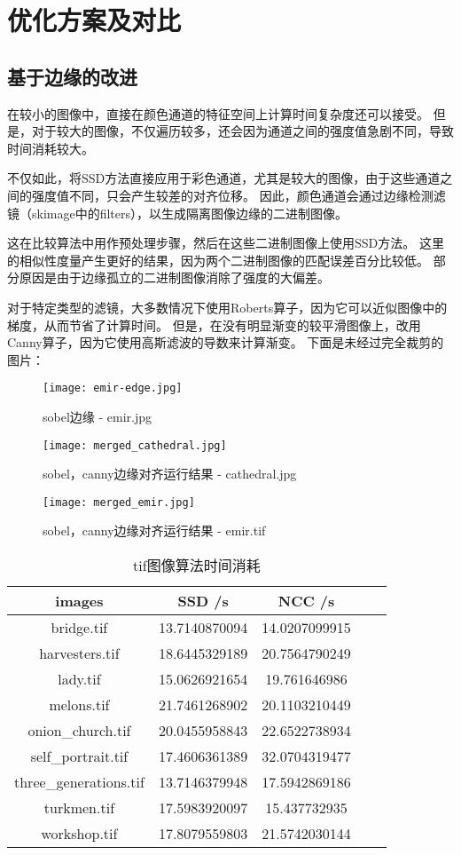 \documentclass[withoutpreface,bwprint]{cumcmthesis} %
\begin{document}
\section{优化方案及对比}

\subsection{基于边缘的改进}
在较小的图像中，直接在颜色通道的特征空间上计算时间复杂度还可以接受。 但是，对于较大的图像，不仅遍历较多，还会因为通道之间的强度值急剧不同，导致时间消耗较大。

不仅如此，将SSD方法直接应用于彩色通道，尤其是较大的图像，由于这些通道之间的强度值不同，只会产生较差的对齐位移。 因此，颜色通道会通过边缘检测滤镜（skimage中的filters），以生成隔离图像边缘的二进制图像。

这在比较算法中用作预处理步骤，然后在这些二进制图像上使用SSD方法。 这里的相似性度量产生更好的结果，因为两个二进制图像的匹配误差百分比较低。 部分原因是由于边缘孤立的二进制图像消除了强度的大偏差。

对于特定类型的滤镜，大多数情况下使用Roberts算子，因为它可以近似图像中的梯度，从而节省了计算时间。 但是，在没有明显渐变的较平滑图像上，改用Canny算子，因为它使用高斯滤波的导数来计算渐变。
下面是未经过完全裁剪的图片：
\begin{figure}[H]
	\centering
	\texttt{[image: emir-edge.jpg]}
    \caption{ sobel边缘 - emir.jpg \label{fig:1}}
\end{figure}

\begin{figure}[H]
	\centering
	\texttt{[image: merged\_cathedral.jpg]}
    \caption{ sobel，canny边缘对齐运行结果 - cathedral.jpg \label{fig:1}}
    \texttt{[image: merged\_emir.jpg]}
	\caption{ sobel，canny边缘对齐运行结果 - emir.tif \label{fig:1}}
\end{figure}
\begin{table}[!htbp]
    \caption{tif图像算法时间消耗}\label{tab:003} \centering
    \begin{tabular}{ccccc}
        \toprule[1.5pt]
        images &SSD	/s & NCC /s \\
        \midrule[1pt]
        bridge.tif&	13.7140870094 &	14.0207099915 \\
        harvesters.tif&	18.6445329189 &	20.7564790249 \\
        lady.tif&	15.0626921654 &	19.761646986 \\
        melons.tif&	21.7461268902 &	20.1103210449 \\
        onion\_church.tif &	20.0455958843 &	22.6522738934  \\
        self\_portrait.tif &	17.4606361389 &	32.0704319477  \\
        three\_generations.tif &	13.7146379948 &	17.5942869186 \\
        turkmen.tif & 17.5983920097 &	15.437732935 \\
        workshop.tif&	17.8079559803 &	21.5742030144 \\
        \bottomrule[1.5pt]
    \end{tabular}
\end{table}
\end{document}
